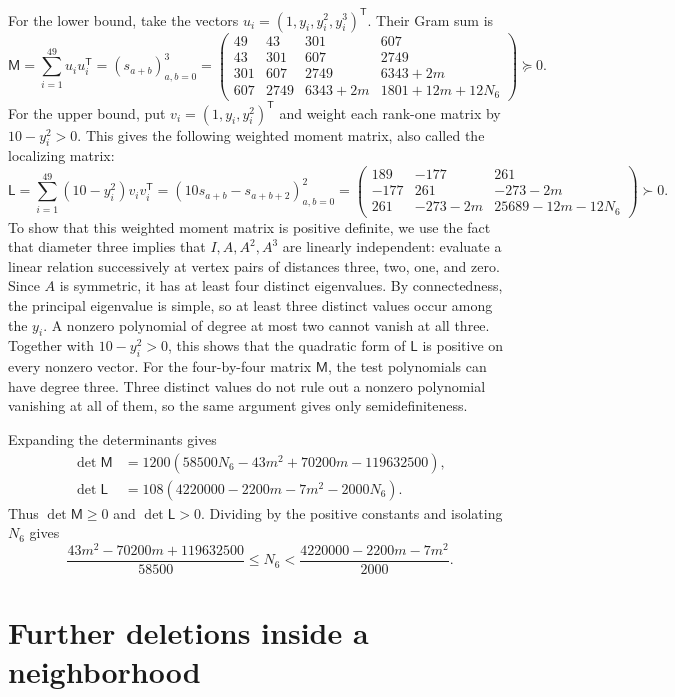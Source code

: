 \documentclass[a4paper,10pt,reqno]{amsart}
\theoremstyle{plain}
\theoremstyle{definition}
\theoremstyle{remark}
\begin{document}
For the lower bound, take the vectors
\(u_i=(1,y_i,y_i^2,y_i^3)^{\mathsf T}\).
Their Gram sum is
\[
 \mathsf M=\sum_{i=1}^{49}u_i u_i^{\mathsf T}
 =(s_{a+b})_{a,b=0}^3
 =
 \begin{pmatrix}
 49&43&301&607\\
 43&301&607&2749\\
 301&607&2749&6343+2m\\
 607&2749&6343+2m&1801+12m+12N_6
 \end{pmatrix}\succeq0.
\]
For the upper bound, put \(v_i=(1,y_i,y_i^2)^{\mathsf T}\) and weight each
rank-one matrix by \(10-y_i^2>0\). This gives the following weighted moment
matrix, also called the localizing matrix:
\[
 \mathsf L=\sum_{i=1}^{49}(10-y_i^2)v_i v_i^{\mathsf T}
 =(10s_{a+b}-s_{a+b+2})_{a,b=0}^2
 =
 \begin{pmatrix}
 189&-177&261\\
 -177&261&-273-2m\\
 261&-273-2m&25689-12m-12N_6
 \end{pmatrix}\succ0.
\]
To show that this weighted moment matrix is positive definite, we use the fact that diameter three implies that \(I,A,A^2,A^3\) are
linearly independent: evaluate a linear relation successively at vertex
pairs of distances three, two, one, and zero. Since \(A\) is symmetric,
it has at least four distinct eigenvalues. By connectedness, the
principal eigenvalue is simple, so at least three distinct values occur among
the \(y_i\). A nonzero polynomial of degree at most two cannot vanish at all three.
Together with \(10-y_i^2>0\), this shows that the quadratic form of
\(\mathsf L\) is positive on every nonzero vector.
For the four-by-four matrix \(\mathsf M\), the test polynomials can have
degree three. Three distinct values do not rule out a nonzero polynomial
vanishing at all of them, so the same argument gives only semidefiniteness.

Expanding the determinants gives
\begin{align*}
 \det\mathsf M
 &=1200(58500N_6-43m^2+70200m-119632500),\\
 \det\mathsf L
 &=108(4220000-2200m-7m^2-2000N_6).
\end{align*}
Thus \(\det\mathsf M\ge0\) and \(\det\mathsf L>0\).
Dividing by the positive constants and isolating \(N_6\) gives
\[
 \frac{43m^2-70200m+119632500}{58500}
 \le N_6
 <\frac{4220000-2200m-7m^2}{2000}.
\]

\section{Further deletions inside a neighborhood}
\label{app:neighborhood-deletions}
\end{document}
